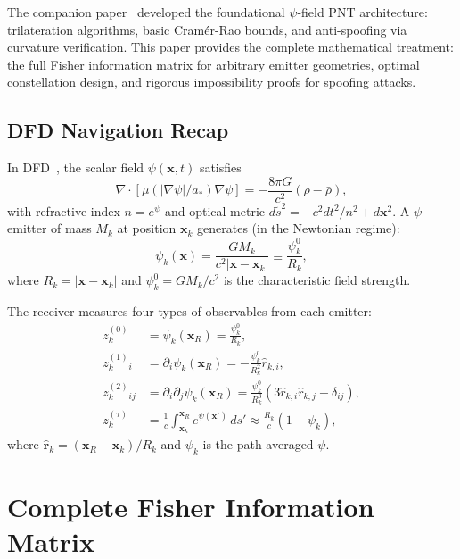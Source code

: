 \documentclass[twocolumn,superscriptaddress,prd,nofootinbib]{revtex4-2}
\newcommand{\astar}{a_*}
\newcommand{\xvec}{\mathbf{x}}
\newcommand{\rvec}{\mathbf{r}}
\begin{document}
The companion paper~\cite{Alcock2025PsiNav} developed the foundational
$\psi$-field PNT architecture: trilateration algorithms, basic
Cram\'er-Rao bounds, and anti-spoofing via curvature verification. This
paper provides the complete mathematical treatment: the full Fisher
information matrix for arbitrary emitter geometries, optimal constellation
design, and rigorous impossibility proofs for spoofing attacks.

\subsection{DFD Navigation Recap}

In DFD~\cite{Alcock2025DFD}, the scalar field
$\psi(\xvec,t)$ satisfies
\begin{equation}
\nabla\cdot[\mu(|\nabla\psi|/\astar)\nabla\psi]
= -\frac{8\pi G}{c^2}(\rho - \bar\rho),
\label{eq:field-eq}
\end{equation}
with refractive index $n = e^\psi$ and optical metric
$d\tilde{s}^2 = -c^2 dt^2/n^2 + d\xvec^2$.
A $\psi$-emitter of mass $M_k$ at position $\xvec_k$ generates
(in the Newtonian regime):
\begin{equation}
\psi_k(\xvec) = \frac{GM_k}{c^2|\xvec - \xvec_k|} \equiv \frac{\psi_k^0}{R_k},
\label{eq:psi-emitter}
\end{equation}
where $R_k = |\xvec - \xvec_k|$ and
$\psi_k^0 = GM_k/c^2$ is the characteristic field strength.

The receiver measures four types of observables from each emitter:
\begin{align}
z_k^{(0)} &= \psi_k(\xvec_R) = \frac{\psi_k^0}{R_k}, \label{eq:obs-scalar}\\
z_k^{(1)}_i &= \partial_i\psi_k(\xvec_R) = -\frac{\psi_k^0}{R_k^2}\hat{r}_{k,i}, \label{eq:obs-grad}\\
z_k^{(2)}_{ij} &= \partial_i\partial_j\psi_k(\xvec_R)
= \frac{\psi_k^0}{R_k^3}(3\hat{r}_{k,i}\hat{r}_{k,j} - \delta_{ij}), \label{eq:obs-curv}\\
z_k^{(\tau)} &= \frac{1}{c}\int_{\xvec_k}^{\xvec_R} e^{\psi(\xvec')}\,ds'
\approx \frac{R_k}{c}(1 + \bar\psi_k), \label{eq:obs-delay}
\end{align}
where $\hat{\rvec}_k = (\xvec_R - \xvec_k)/R_k$ and
$\bar\psi_k$ is the path-averaged $\psi$.

\section{Complete Fisher Information Matrix}\label{sec:fim}
\end{document}
